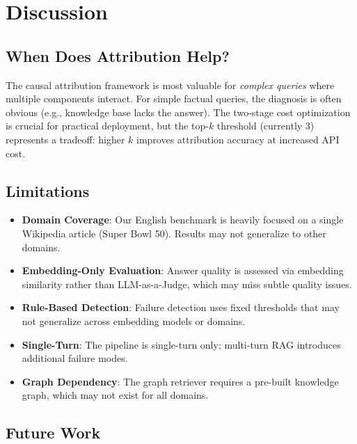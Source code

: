 \documentclass[11pt,a4paper]{article}
\begin{document}
\section{Discussion}

\subsection{When Does Attribution Help?}

The causal attribution framework is most valuable for \textit{complex queries} where multiple components interact. For simple factual queries, the diagnosis is often obvious (e.g., knowledge base lacks the answer). The two-stage cost optimization is crucial for practical deployment, but the top-$k$ threshold (currently 3) represents a tradeoff: higher $k$ improves attribution accuracy at increased API cost.

\subsection{Limitations}

\begin{itemize}[leftmargin=*,itemsep=1pt]
\item \textbf{Domain Coverage}: Our English benchmark is heavily focused on a single Wikipedia article (Super Bowl 50). Results may not generalize to other domains.
\item \textbf{Embedding-Only Evaluation}: Answer quality is assessed via embedding similarity rather than LLM-as-a-Judge, which may miss subtle quality issues.
\item \textbf{Rule-Based Detection}: Failure detection uses fixed thresholds that may not generalize across embedding models or domains.
\item \textbf{Single-Turn}: The pipeline is single-turn only; multi-turn RAG introduces additional failure modes.
\item \textbf{Graph Dependency}: The graph retriever requires a pre-built knowledge graph, which may not exist for all domains.
\end{itemize}

\subsection{Future Work}
\end{document}
